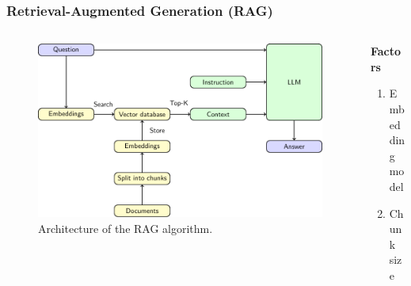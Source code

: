 \documentclass{beamer}
\begin{document}
\begin{frame}
  \frametitle{Retrieval-Augmented Generation (RAG)}
  \begin{columns}[onlytextwidth,T]
    \begin{column}{0.75\textwidth}
      \begin{figure}[h]
        \includegraphics[scale=0.6]{src/fig/pdfs/tikz/RAG_scheme.pdf}
        \caption{Architecture of the RAG algorithm.}
       \end{figure}
    \end{column}

      \begin{column}{0.75\textwidth}
        \textcolor{cvut_navy}{\textbf{Factors}}
        \begin{enumerate}
          \item Embedding \\model
          \item Chunk size
        \end{enumerate}
    \end{column}
  \end{columns}
  
  
\end{frame}
\end{document}
